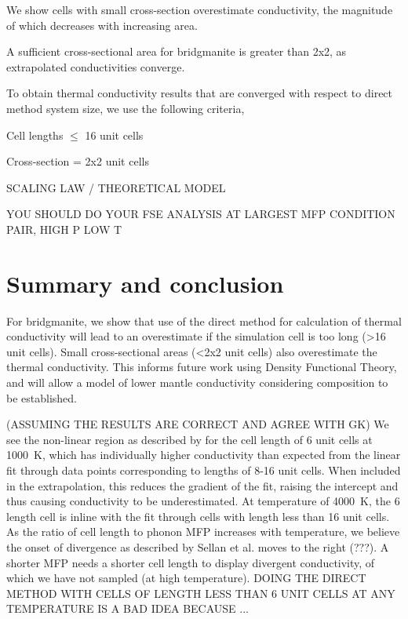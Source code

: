\documentclass[%
preprint,                                  %
nofootinbib,
 amsmath,amssymb,
 aps,
]{revtex4-1}
\begin{document}
We show cells with small cross-section overestimate conductivity, the magnitude of which decreases with increasing area. 

A sufficient cross-sectional area for bridgmanite is greater than 2x2, as extrapolated conductivities converge. 

To obtain thermal conductivity results that are converged with respect to direct method system size, we use the following criteria,

Cell lengths $\leq$ 16 unit cells

Cross-section = 2x2 unit cells

SCALING LAW / THEORETICAL MODEL

YOU SHOULD DO YOUR FSE ANALYSIS AT LARGEST MFP CONDITION PAIR, HIGH P LOW T


















\section{\label{sec:summary}Summary and conclusion}

For bridgmanite, we show that use of the direct method for calculation of thermal conductivity will lead to an overestimate if the simulation cell is too long (\textgreater 16 unit cells). Small cross-sectional areas (\textless 2x2 unit cells) also overestimate the thermal conductivity. This informs future work using Density Functional Theory, and will allow a model of lower mantle conductivity considering composition to be established.



(ASSUMING THE RESULTS ARE CORRECT AND AGREE WITH GK) We see the non-linear region as described by \citet{Sellan2010} for the cell length of 6 unit cells at 1000~K, which has individually higher conductivity than expected from the linear fit through data points corresponding to lengths of 8-16 unit cells. When included in the extrapolation, this reduces the gradient of the fit, raising the intercept and thus causing conductivity to be underestimated. At temperature of 4000~K, the 6 length cell is inline with the fit through cells with length less than 16 unit cells. As the ratio of cell length to phonon MFP increases with temperature, we believe the onset of divergence as described by Sellan et al. moves to the right (???). A shorter MFP needs a shorter cell length to display divergent conductivity, of which we have not sampled (at high temperature). DOING THE DIRECT METHOD WITH CELLS OF LENGTH LESS THAN 6 UNIT CELLS AT ANY TEMPERATURE IS A BAD IDEA BECAUSE ... 
\end{document}

